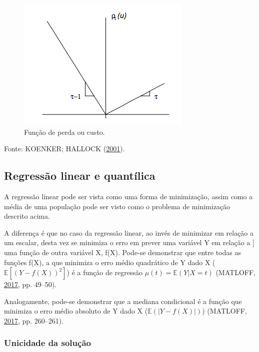 \documentclass[a4paper, 12pt]{article}
\newcommand{\bcenter}{\begin{center}}
\newcommand{\ecenter}{\end{center}}
\begin{document}
\begin{figure}[H]

{\centering \includegraphics[width=0.7\linewidth]{DmKq7} 

}

\caption{Função de perda ou custo.}\label{fig:unnamed-chunk-1}
\end{figure}

\bcenter Fonte: KOENKER; HALLOCK (\protect\hyperlink{ref-qr}{2001}).
\ecenter

\hypertarget{regressao-linear-e-quantilica}{%
\subsection{Regressão linear e
quantílica}\label{regressao-linear-e-quantilica}}

A regressão linear pode ser vista como uma forma de minimização, assim
como a média de uma população pode ser visto como o problema de
minimização descrito acima.

A diferença é que no caso da regressão linear, ao invés de minimizar em
relação a um escalar, desta vez se minimiza o erro em prever uma
variável Y em relação a {]} uma função de outra variável X, f(X).
Pode-se demonstrar que entre todas as funções f(X), a que minimiza o
erro médio quadrático de Y dado X (\(\mathbb{E}[(Y - f(X))^2]\)) é a
função de regressão \(\mu(t) = \mathbb{E}(Y|X=t)\) (MATLOFF,
\protect\hyperlink{ref-matloff2017}{2017}, pp. 49--50).

Analogamente, pode-se demonstrar que a mediana condicional é a função
que minimiza o erro médio absoluto de Y dado X
(\(\mathbb{E}(|Y-f(X)|)\)) (MATLOFF,
\protect\hyperlink{ref-matloff2017}{2017}, pp. 260--261).

\hypertarget{unicidade-da-solucao}{%
\subsubsection{Unicidade da solução}\label{unicidade-da-solucao}}
\end{document}
